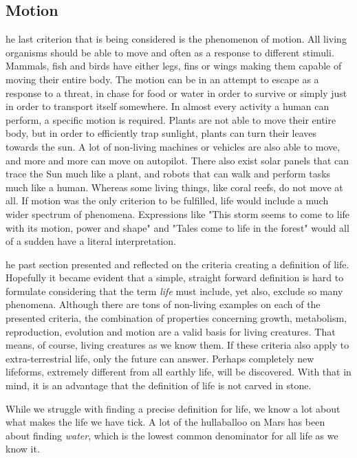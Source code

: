 \subsection{Motion}
he last criterion that is being considered is the phenomenon of motion.
All living organisms should be able to move and often as a response to different stimuli.
Mammals, fish and birds have either legs, fins or wings making them capable of moving their entire body.
The motion can be in an attempt to escape as a response to a threat, in chase for food or water in order to survive or simply just in order to transport itself somewhere.
In almost every activity a human can perform, a specific motion is required.
Plants are not able to move their entire body, but in order to efficiently trap sunlight, plants can turn their leaves towards the sun.
A lot of non-living machines or vehicles are also able to move, and more and more can move on autopilot.
There also exist solar panels that can trace the Sun much like a plant, and robots that can walk and perform tasks much like a human.
Whereas some living things, like coral reefs, do not move at all.
If motion was the only criterion to be fulfilled, life would include a much wider spectrum of phenomena.
Expressions like "This storm seems to come to life with its motion, power and shape" and "Tales come to life in the forest" would all of a sudden have a literal interpretation. 


he past section presented and reflected on the criteria creating a definition of life.
Hopefully it became evident that a simple, straight forward definition is hard to formulate considering that the term \textit{life} must include, yet also, exclude so many phenomena.
Although there are tons of non-living examples on each of the presented criteria, the combination of properties concerning growth, metabolism, reproduction, evolution and motion are a valid basis for living creatures.
That means, of course, living creatures as we know them.
If these criteria also apply to extra-terrestrial life, only the future can answer.
Perhaps completely new lifeforms, extremely different from all earthly life, will be discovered.
With that in mind, it is an advantage that the definition of life is not carved in stone. 


While we struggle with finding a precise definition for life, we know a lot about what makes the life we have tick. A lot of the hullaballoo on Mars has been about finding \emph{water}, which is the lowest common denominator for all life as we know it. 